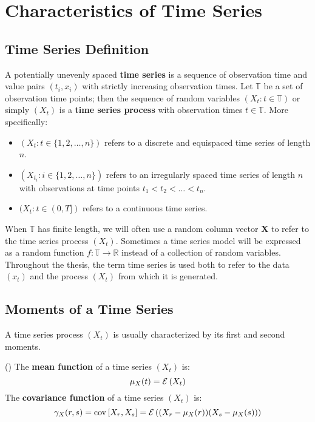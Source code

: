 
\chapter{Characteristics of Time Series}

\section{Time Series Definition}\label{sec:time-series-definition}

A potentially unevenly spaced \textbf{time series} is a sequence of observation
time and value pairs $(t_i, x_i)$ with strictly increasing observation times. Let
$\mathbb{T}$ be a set of observation time points; then the sequence of random
variables $(X_t: t \in \mathbb{T})$ or simply $(X_t)$ is a \textbf{time series
process} with observation times $t \in \mathbb{T}$. More specifically:

\begin{itemize}
    \item $(X_t: t \in \{1, 2, \dots, n\})$ refers to a discrete and equispaced
    time series of length $n$.
    \item $(X_{t_i}: i \in \{1, 2, \dots, n\})$ refers to an irregularly spaced
    time series of length $n$ with observations at time points $t_1 < t_2 < \dots
    < t_n$.
    \item $(X_{t}: t \in (0, T])$ refers to a continuous time series.
\end{itemize}

When $\mathbb{T}$ has finite length, we will often use a random column vector
$\mathbf{X}$ to refer to the time series process $(X_t)$. Sometimes a time series
model will be expressed as a random function $f: \mathbb{T} \to \mathbb{R}$ instead
of a collection of random variables. Throughout the thesis, the term time series
is used both to refer to the data $(x_t)$ and the process $(X_t)$ from which it is
generated.

\section{Moments of a Time Series}\label{sec:time_series_moments}

A time series process $(X_t)$ is usually characterized by its first and second
moments.

\begin{definition}(\citeauthor{brockwell_introduction_2016})\label{def:time_series_moments}
    The \textbf{mean function} of a time series $(X_t)$ is:
    \[
        \mu_X(t) = \ERW{X_t}
    \]
    The \textbf{covariance function} of a time series $(X_t)$ is:
    \[
        \gamma_X(r,s) = \COV{X_r, X_s} = \ERW{(X_r - \mu_X(r))(X_s-\mu_X(s))}
    \]
\end{definition}

